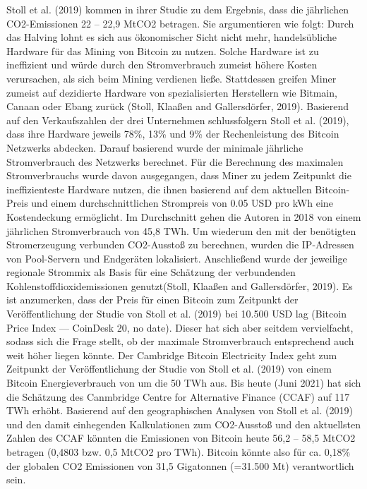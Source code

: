 Stoll et al. (2019) kommen in ihrer Studie zu dem Ergebnis, dass die jährlichen CO2-Emissionen 22 – 22,9 MtCO2 betragen. Sie argumentieren wie folgt: Durch das Halving lohnt es sich aus ökonomischer Sicht nicht mehr, handelsübliche Hardware für das Mining von Bitcoin zu nutzen. Solche Hardware ist zu ineffizient und würde durch den Stromverbrauch zumeist höhere Kosten verursachen, als sich beim Mining verdienen ließe. Stattdessen greifen Miner zumeist auf dezidierte Hardware von spezialisierten Herstellern wie Bitmain, Canaan oder Ebang zurück (Stoll, Klaaßen and Gallersdörfer, 2019). Basierend auf den Verkaufszahlen der drei Unternehmen schlussfolgern Stoll et al. (2019), dass ihre Hardware jeweils 78\%, 13\% und 9\% der Rechenleistung des Bitcoin Netzwerks abdecken. Darauf basierend wurde der minimale jährliche Stromverbrauch des Netzwerks berechnet. Für die Berechnung des maximalen Stromverbrauchs wurde davon ausgegangen, dass Miner zu jedem Zeitpunkt die ineffizienteste Hardware nutzen, die ihnen basierend auf dem aktuellen Bitcoin-Preis und einem durchschnittlichen Strompreis von 0.05 USD pro kWh eine Kostendeckung ermöglicht. Im Durchschnitt gehen die Autoren in 2018 von einem jährlichen Stromverbrauch von 45,8 TWh. Um wiederum den mit der benötigten Stromerzeugung verbunden CO2-Ausstoß zu berechnen, wurden die IP-Adressen von Pool-Servern und Endgeräten lokalisiert. Anschließend wurde der jeweilige regionale Strommix als Basis für eine Schätzung der verbundenden Kohlenstoffdioxidemissionen genutzt(Stoll, Klaaßen and Gallersdörfer, 2019). Es ist anzumerken, dass der Preis für einen Bitcoin zum Zeitpunkt der Veröffentlichung der Studie von Stoll et al. (2019) bei 10.500 USD lag (Bitcoin Price Index — CoinDesk 20, no date). Dieser hat sich aber seitdem vervielfacht, sodass sich die Frage stellt, ob der maximale Stromverbrauch entsprechend auch weit höher liegen könnte. Der Cambridge Bitcoin Electricity Index geht zum Zeitpunkt der Veröffentlichung der Studie von Stoll et al. (2019) von einem Bitcoin Energieverbrauch von um die 50 TWh aus. Bis heute (Juni 2021) hat sich die Schätzung des Canmbridge Centre for Alternative Finance (CCAF) auf 117 TWh erhöht. Basierend auf den geographischen Analysen von Stoll et al. (2019) und den damit einhegenden Kalkulationen zum CO2-Ausstoß und den aktuellsten Zahlen des CCAF könnten die Emissionen von Bitcoin heute 56,2 – 58,5 MtCO2 betragen (0,4803 bzw. 0,5 MtCO2 pro TWh). Bitcoin könnte also für ca. 0,18\% der globalen CO2 Emissionen von 31,5 Gigatonnen (=31.500 Mt) verantwortlich sein.
\newline


